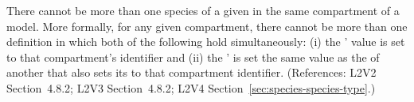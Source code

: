 There cannot be more than one species of a given \SpeciesType in the same
compartment of a model.  More formally, for any given compartment, there
cannot be more than one \Species definition in which both of the following
hold simultaneously: (i) the \Species'  value is set to
that compartment's identifier and (ii) the \Species'  is
set the same value as the  of another \Species that also
sets its  to that compartment identifier.  (References:
L2V2 Section~4.8.2; L2V3 Section~4.8.2; L2V4 Section~\ref{sec:species-species-type}.)
